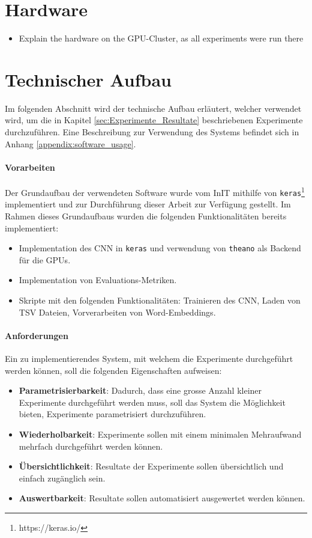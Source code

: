 \section{Hardware}
\begin{itemize}
	\item Explain the hardware on the GPU-Cluster, as all experiments were run there
\end{itemize}

\iffalse
\section{Technischer Aufbau}
\label{technical_setup}
Im folgenden Abschnitt wird der technische Aufbau erläutert, welcher verwendet wird, um die in Kapitel \ref{sec:Experimente_Resultate} beschriebenen Experimente durchzuführen. Eine Beschreibung zur Verwendung des Systems befindet sich in Anhang \ref{appendix:software_usage}.

\paragraph{Vorarbeiten}
\label{technichal_setup:prework}
Der Grundaufbau der verwendeten Software wurde vom InIT mithilfe von \texttt{keras}\footnote{https://keras.io/} implementiert und zur Durchführung dieser Arbeit zur Verfügung gestellt. Im Rahmen dieses Grundaufbaus wurden die folgenden Funktionalitäten bereits implementiert:

\begin{itemize}[noitemsep]
	\item Implementation des CNN in \texttt{keras} und verwendung von \texttt{theano} \cite{theanoCitShort} als Backend für die \gls{GPU}s.
	\item Implementation von Evaluations-Metriken.
	\item Skripte mit den folgenden Funktionalitäten: Trainieren des CNN, Laden von TSV Dateien, Vorverarbeiten von Word-Embeddings.
\end{itemize}

\paragraph{Anforderungen}
\label{technical_setup:requirements}
Ein zu implementierendes System, mit welchem die Experimente durchgeführt werden können, soll die folgenden Eigenschaften aufweisen:

\begin{itemize}
	\item \textbf{Parametrisierbarkeit}: Dadurch, dass eine grosse Anzahl kleiner Experimente durchgeführt werden muss, soll das System die Möglichkeit bieten, Experimente parametrisiert durchzuführen.
	\item \textbf{Wiederholbarkeit}: Experimente sollen mit einem minimalen Mehraufwand mehrfach durchgeführt werden können.
	\item \textbf{Übersichtlichkeit}: Resultate der Experimente sollen übersichtlich und einfach zugänglich sein.
	\item \textbf{Auswertbarkeit}: Resultate sollen automatisiert ausgewertet werden können.
\end{itemize}

